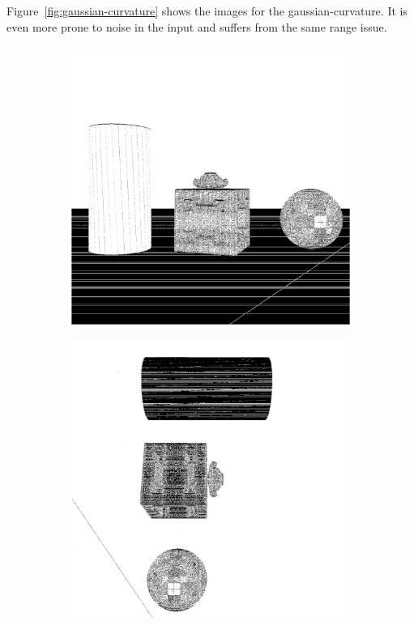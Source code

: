 Figure~\ref{fig:gaussian-curvature} shows the images for the \gls{gaussian-curvature}.
It is even more prone to noise in the input and suffers from the same range issue.
\begin{figure}[H]
    \begin{subfigure}[t]{0.32\textwidth}
        \includegraphics[width=\linewidth]{chapter04/img/gauss-0001.png}
    \end{subfigure}
    \begin{subfigure}[t]{0.32\textwidth}
        \includegraphics[width=\linewidth]{chapter04/img/gauss-0030.png}

\end{subfigure}
\end{figure}
